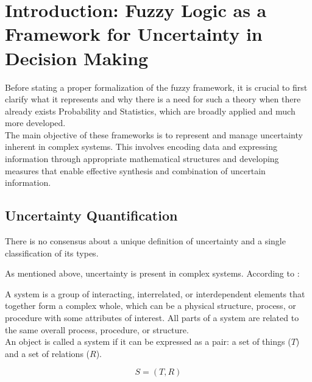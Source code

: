 \setcounter{chapter}{-1}
\chapter{Introduction: Fuzzy Logic as a Framework for Uncertainty in Decision Making}

Before stating a proper formalization of the fuzzy framework, it is crucial to first clarify what it represents and why there is a need for such a theory when there already exists Probability and Statistics, which are broadly applied and much more developed.\\

The main objective of these frameworks is to represent and manage uncertainty inherent in complex systems. This involves encoding data and expressing information through appropriate mathematical structures and developing measures that enable effective synthesis and combination of uncertain information.

\section{Uncertainty Quantification}

There is no consensus about a unique definition of uncertainty and a single classification of its types. 

As mentioned above, uncertainty is present in complex systems. According to \cite{UncertaintySciences}: 

\begin{definition}[System]
    A system is a group of interacting, interrelated, or interdependent elements that together form a complex whole, which can be a physical structure, process, or procedure with some attributes of interest. All parts of
    a system are related to the same overall process, procedure, or structure.\\

    An object is called a system if it can be expressed as a pair: a set of things ($T$) and a set of relations ($R$).

    \[S = (T,R)\]
\end{definition}

